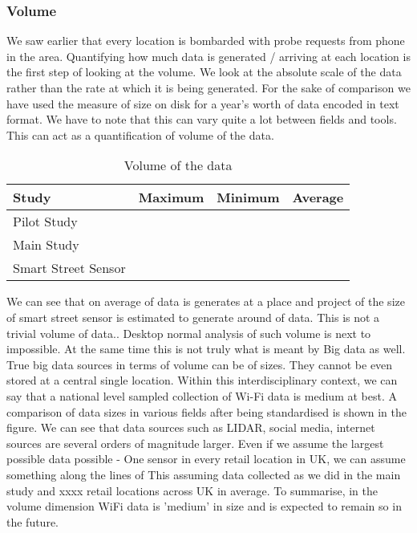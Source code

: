 \subsubsection{Volume}

We saw earlier that every location is bombarded with probe requests from phone in the area.
Quantifying how much data is generated / arriving at each location is the first step of looking at the volume.
We look at the absolute scale of the data rather than the rate at which it is being generated.
For the sake of comparison we have used the measure of size on disk for a year's worth of data encoded in text format.
We have to note that this can vary quite a lot between fields and tools.
This can act as a quantification of volume of the data.

\begin{table}
    \centering
    \begin{tabular}{|l|c|c|c|}
        \hline
        Study & Maximum & Minimum & Average \\
        \hline
        Pilot Study & & & \\
        Main Study & & & \\
        Smart Street Sensor & & & \\
        \hline
    \end{tabular}
    \caption{Volume of the data}
    \label{volume_table}
\end{table}

We can see that on average  of data is generates at a place and project of the size of smart street sensor is estimated to generate around  of data.
This is not a trivial volume of data..
Desktop normal analysis of such volume is next to impossible.
At the same time this is not truly what is meant by Big data as well.
True big data sources in terms of volume can be of  sizes.
They cannot be even stored at a central single location.
Within this interdisciplinary context, we can say that a national level sampled collection of Wi-Fi data is medium at best.
A comparison of data sizes in various fields after being standardised is shown in the figure.
We can see that data sources such as LIDAR, social media, internet sources are several orders of magnitude larger.
Even if we assume the largest possible data possible - One sensor in every retail location in UK, we can assume something along the lines of  This assuming data collected as we did in the main study and xxxx retail locations across UK in average.
To summarise, in the volume dimension WiFi data is 'medium' in size and is expected to remain so in the future.

